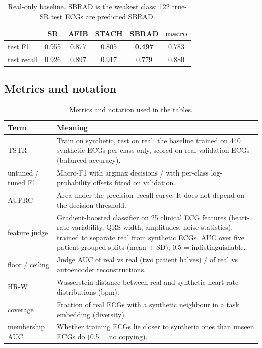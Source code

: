 \documentclass[11pt,a4paper]{article}
\begin{document}
\begin{table}[H]\centering\small
\begin{tabular}{lccccc}\toprule
 & SR & AFIB & STACH & SBRAD & macro \\\midrule
test F1 & 0.955 & 0.877 & 0.805 & \textbf{0.497} & 0.783 \\
test recall & 0.926 & 0.897 & 0.917 & 0.779 & 0.880 \\\bottomrule
\end{tabular}
\caption{Real-only baseline. SBRAD is the weakest class: 122 true-SR test ECGs are predicted SBRAD.}
\end{table}

\subsection{Metrics and notation}
\begin{table}[H]\centering\small
\begin{tabular}{p{3.4cm}p{11.2cm}}\toprule
Term & Meaning \\\midrule
TSTR & Train on synthetic, test on real: the baseline trained on 440 synthetic ECGs per class only, scored on real
       validation ECGs (balanced accuracy). \\
untuned / tuned F1 & Macro-F1 with argmax decisions / with per-class log-probability offsets fitted on validation. \\
AUPRC & Area under the precision--recall curve. It does not depend on the decision threshold. \\
feature judge & Gradient-boosted classifier on 25 clinical ECG features (heart-rate variability, QRS width,
       amplitudes, noise statistics), trained to separate real from synthetic ECGs. AUC over five patient-grouped
       splits (mean $\pm$ SD); 0.5 = indistinguishable. \\
floor / ceiling & Judge AUC of real vs real (two patient halves) / of real vs autoencoder reconstructions. \\
HR-W & Wasserstein distance between real and synthetic heart-rate distributions (bpm). \\
coverage & Fraction of real ECGs with a synthetic neighbour in a task embedding (diversity). \\
membership AUC & Whether training ECGs lie closer to synthetic ones than unseen ECGs do (0.5 = no copying). \\\bottomrule
\end{tabular}
\caption{Metrics and notation used in the tables.}
\end{table}
\end{document}
